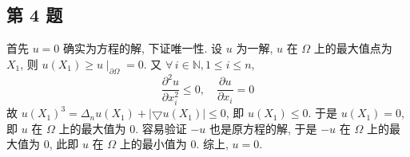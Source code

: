 \documentclass[../main.tex]{subfiles}
\begin{document}
\subsection{第 4 题}
首先 $u = 0$ 确实为方程的解, 下证唯一性.
设 $u$ 为一解, $u$ 在 $\Omega$ 上的最大值点为 $X_1$, 则 $u \left( X_1 \right) \geqslant u \mid_{\partial \Omega} = 0$.
又 $\forall \, i \in \mathbb{N}, 1 \leqslant i \leqslant n$,
\[
    \frac{\partial^2 u}{\partial x_i^2} \leqslant 0
    , \quad
    \frac{\partial u}{\partial x_i} = 0
\]
故 $u \left( X_1 \right)^3 = \Delta_n u \left( X_1 \right) + \left| \bigtriangledown u \left( X_1 \right) \right| \leqslant 0$,
即 $u \left( X_1 \right) \leqslant 0$.
于是 $u \left( X_1 \right) = 0$, 即 $u$ 在 $\Omega$ 上的最大值为 $0$.
容易验证 $- u$ 也是原方程的解, 于是 $- u$ 在 $\Omega$ 上的最大值为 $0$,
此即 $u$ 在 $\Omega$ 上的最小值为 $0$.
综上, $u = 0$.
\end{document}
